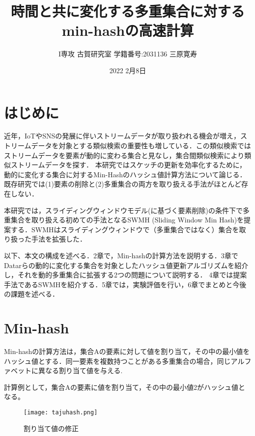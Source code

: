 \documentclass[a4j,twocolumn,dvipdfmx,autodetect-engine]{jsarticle}
\title{時間と共に変化する多重集合に対するmin-hashの高速計算}
\author{I専攻 古賀研究室  学籍番号:2031136 三原寛寿}
\date{2022 2月8日}
\begin{document}
\maketitle


\section{はじめに}
近年，IoTやSNSの発展に伴いストリームデータが取り扱われる機会が増え，ストリームデータを対象とする類似検索の重要性も増している．この類似検索ではストリームデータを要素が動的に変わる集合と見なし，集合間類似検索により類似ストリームデータを探す．%
本研究ではスケッチの更新を効率化するために，動的に変化する集合に対するMin-Hash\cite{Minhash}のハッシュ値計算方法について論じる． 既存研究では(1)要素の削除と(2)多重集合の両方を取り扱える手法がほとんど存在しない．

本研究では，スライディングウィンドウモデル(に基づく要素削除)の条件下で多重集合を取り扱える初めての手法となるSWMH (Sliding Window Min Hash)を提案する．SWMHはスライディングウィンドウで（多重集合ではなく）集合を取り扱った手法を拡張した．

以下、本文の構成を述べる．2章で，Min-hashの計算方法を説明する．3章でDatarらの動的に変化する集合を対象としたハッシュ値更新アルゴリズムを紹介し，それを動的多重集合に拡張する2つの問題について説明する．
4章では提案手法であるSWMHを紹介する．5章では，実験評価を行い，6章でまとめと今後の課題を述べる．




\section{Min-hash}
Min-hashの計算方法は，集合Aの要素に対して値を割り当て，その中の最小値をハッシュ値とする．同一要素を複数持つことがある多重集合の場合，同じアルファベットに異なる割り当て値を与える.

計算例として，集合Aの要素に値を割り当て，その中の最小値2がハッシュ値となる。


\begin{figure}[H]
  \centering
  \texttt{[image: tajuhash.png]}
  \caption{割り当て値の修正}
\end{figure}
\end{document}
